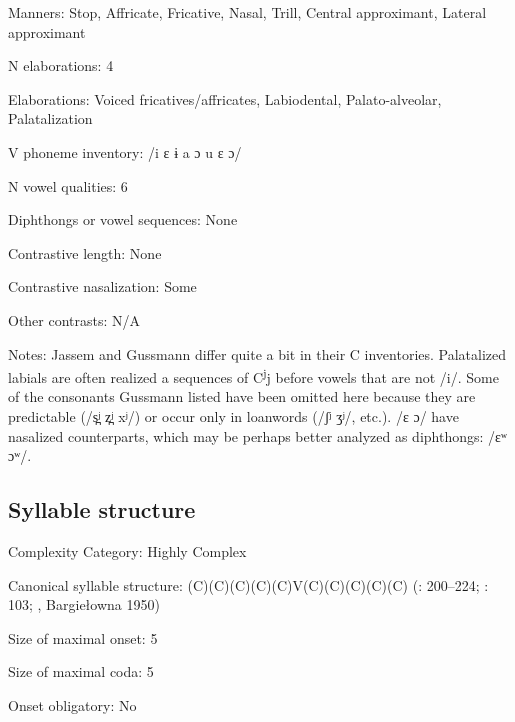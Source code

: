 {\begin{appendixdesc}
\item[Manners:] Stop, Affricate, Fricative, Nasal, Trill, Central approximant, Lateral approximant

\item[N elaborations:] 4

\item[Elaborations:] Voiced fricatives/affricates, Labiodental, Palato-alveolar, Palatalization

\item[V phoneme inventory:] /i ɛ ɨ a ɔ u ɛ ɔ/

\item[N vowel qualities:] 6

\item[Diphthongs or vowel sequences:] None

\item[Contrastive length:] None

\item[Contrastive nasalization:] Some

\item[Other contrasts:] N/A

\item[Notes:] Jassem and Gussmann differ quite a bit in their C inventories. Palatalized labials are often realized a sequences of C\textsuperscript{j}j before vowels that are not /i/. Some of the consonants Gussmann listed have been omitted here because they are predictable (/s̪ʲ z̪ʲ xʲ/) or occur only in loanwords (/ʃʲ ʒʲ/, etc.). /ɛ ɔ/ have nasalized counterparts, which may be perhaps better analyzed as diphthongs: /ɛʷ ɔʷ/.
\end{appendixdesc}
\subsection*{Syllable structure}
\begin{appendixdesc}

\item[Complexity Category:] Highly Complex

\item[Canonical syllable structure:] (C)(C)(C)(C)(C)V(C)(C)(C)(C)(C) (\citealt{Gussmann2007}: 200--224; \citealt{Jassem2003}: 103; \citealt{Zydorowicz2010}, Bargiełowna 1950)

\item[Size of maximal onset:] 5

\item[Size of maximal coda:] 5

\item[Onset obligatory:] No


\end{appendixdesc}}

